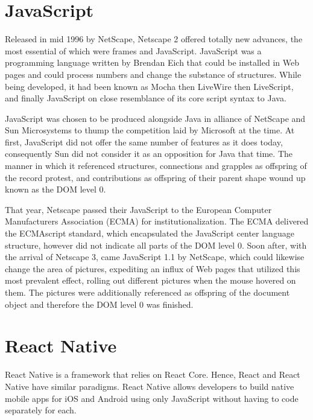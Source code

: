 \appendix
\begin{appendices}
\chapter{JavaScript}
\label{app:javascript}
Released in mid 1996 by NetScape, Netscape 2 offered totally new advances, the most essential of which were frames and JavaScript. JavaScript was a programming language written by Brendan Eich that could be installed in Web pages and could process numbers and change the substance of structures. While being developed, it had been known as Mocha then LiveWire then LiveScript, and finally JavaScript on close resemblance of its core script syntax to Java.\par \medskip
JavaScript was chosen to be produced alongside Java in alliance of NetScape and Sun Microsystems to thump the competition laid by Microsoft at the time. At first, JavaScript did not offer the same number of features as it does today, consequently Sun did not consider it as an opposition for Java that time. The manner in which it referenced structures, connections and grapples as offspring of the record protest, and contributions as offspring of their parent shape wound up known as the DOM level 0. \par \medskip
That year, Netscape passed their JavaScript to the European Computer Manufacturers Association (ECMA) for institutionalization. The ECMA delivered the ECMAscript standard, which encapsulated the JavaScript center language structure, however did not indicate all parts of the DOM level 0. Soon after, with the arrival of Netscape 3, came JavaScript 1.1 by NetScape, which could likewise change the area of pictures, expediting an influx of Web pages that utilized this most prevalent effect, rolling out different pictures when the mouse hovered on them. The pictures were additionally referenced as offspring of the document object and therefore the DOM level 0 was finished.\par

\chapter{React Native}
\label{app:ReactNative}

React Native is a framework that relies on React Core. Hence, React and React Native have similar paradigms. React Native allows developers to build native mobile apps for iOS and Android using only JavaScript without having to code separately for each.\par


\end{appendices}
